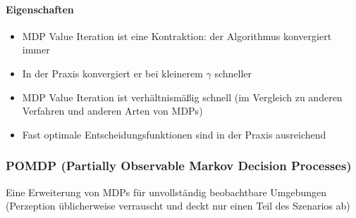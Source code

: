 \paragraph{Eigenschaften}
\begin{itemize}
	\item MDP Value Iteration ist eine Kontraktion: der Algorithmus konvergiert immer
	\item In der Praxis konvergiert er bei kleinerem $\gamma$ schneller
	\item MDP Value Iteration ist verh\"altnism\"a{\ss}ig schnell (im Vergleich zu anderen Verfahren und anderen Arten von MDPs)
	\item Fast optimale Entscheidungsfunktionen sind in der Praxis ausreichend
\end{itemize}

\subsubsection{POMDP (Partially Observable Markov Decision Processes)}
Eine Erweiterung von MDPs f\"ur unvollst\"andig beobachtbare Umgebungen (Perzeption \"ublicherweise verrauscht und deckt nur einen Teil des Szenarios ab)

